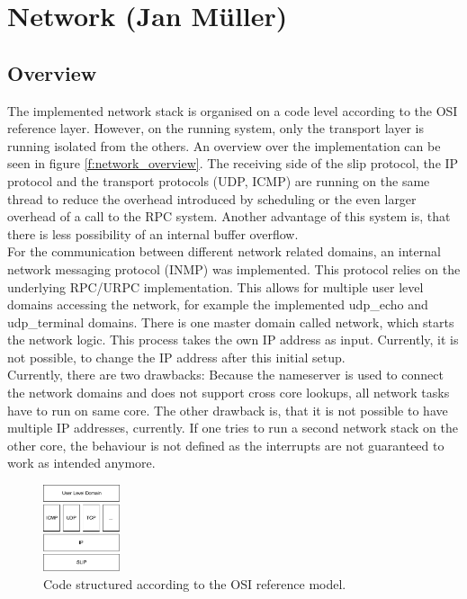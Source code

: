 \section{Network (Jan Müller)}\label{s:network}
\subsection{Overview}
The implemented network stack is organised on a code level according to the OSI reference layer. However, on the running system, only the transport layer is running isolated from the others. An overview over the implementation can be seen in figure \ref{f:network_overview}. The receiving side of the slip protocol, the IP protocol and the transport protocols (UDP, ICMP) are running on the same thread to reduce the overhead introduced by scheduling or the even larger overhead of a call to the RPC system. Another advantage of this system is, that there is less possibility of an internal buffer overflow.\\
For the communication between different network related domains, an internal network messaging protocol (INMP) was implemented. This protocol relies on the underlying RPC/URPC implementation. This allows for multiple user level domains accessing the network, for example the implemented udp\_echo and udp\_terminal domains. There is one master domain called network, which starts the network logic. This process takes the own IP address as input. Currently, it is not possible, to change the IP address after this initial setup. \\
Currently, there are two drawbacks: Because the nameserver is used to connect the network domains and does not support cross core lookups, all network tasks have to run on same core. The other drawback is, that it is not possible to have multiple IP addresses, currently. If one tries to run a second network stack on the other core, the behaviour is not defined as the interrupts are not guaranteed to work as intended anymore.

\begin{figure}
\centering
		\includegraphics[width=0.2\textwidth]{Images/Network}
		\caption{Code structured according to the OSI reference model.}
\end{figure}

